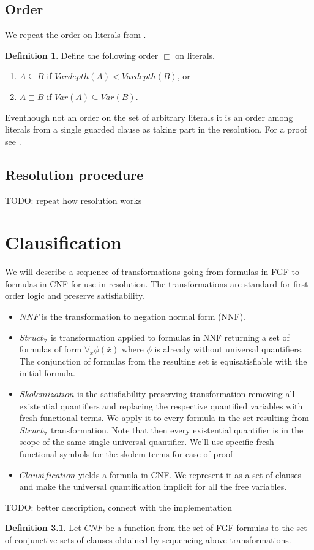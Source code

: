 \documentclass[english, shortabstract]{iithesis}
\theoremstyle{definition} \newtheorem{definition}{Definition}[chapter]
\theoremstyle{remark} \newtheorem{remark}[definition]{Observation}
\theoremstyle{plain} \newtheorem{theorem}[definition]{Theorem}
\theoremstyle{plain} \newtheorem{lemma}[definition]{Lemma}
\begin{document}
\section{Order}
We repeat the order on literals from \cite{resolution gf}.
\begin{definition}
Define the following order $\sqsubset$ on literals.
\begin{enumerate}
    \item $A \subseteq B$ if $Vardepth(A) < Vardepth(B)$, or
    \item $A \sqsubset B$ if $Var(A) \subseteq Var(B)$.
\end{enumerate}
\end{definition}
Eventhough not an order on the set of arbitrary literals it is an order among literals from a single guarded clause as taking part in the resolution.
For a proof see \cite{resolution gf}.
\section{Resolution procedure}
TODO: repeat how resolution works

\chapter{Clausification}

We will describe a sequence of transformations going from formulas in FGF to formulas in CNF for use in resolution. 
The transformations are standard for first order logic and preserve satisfiability.
\begin{itemize}
    \item $NNF$ is the transformation to negation normal form (NNF).
    \item $Struct_{\forall}$ is transformation applied to formulas in NNF returning a set of formulas of form $\forall_{\bar{x}}\phi(\bar{x})$ where $\phi$ is already without universal quantifiers. The conjunction of formulas from the resulting set is equisatisfiable with the initial formula.
    \item $Skolemization$ is the satisfiability-preserving transformation removing all existential quantifiers and replacing the respective quantified variables with fresh functional terms.
    We apply it to every formula in the set resulting from $Struct_\forall$ transformation.
    Note that then every existential quantifier is in the scope of the same single universal quantifier.
    We'll use specific fresh functional symbols for the skolem terms for ease of proof
    \item $Clausification$ yields a formula in CNF. We represent it as a set of clauses and make the universal quantification implicit for all the free variables. 
\end{itemize}
TODO: better description, connect with the implementation
\begin{definition}
    Let $CNF$ be a function from the set of FGF formulas to the set of conjunctive sets of clauses obtained by sequencing above transformations.
\end{definition}
\end{document}
